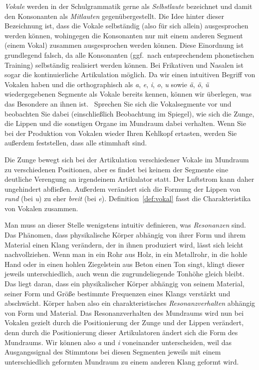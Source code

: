 \textit{Vokale} werden in der Schulgrammatik gerne als \textit{Selbstlaute} bezeichnet und damit den Konsonanten als \textit{Mitlauten} gegenübergestellt.
Die Idee hinter dieser Bezeichnung ist, dass die Vokale selbständig (also für sich allein) ausgesprochen werden können, wohingegen die Konsonanten nur mit einem anderen Segment (einem Vokal) zusammen ausgesprochen werden können.
Diese Einordnung ist grundlegend falsch, da alle Konsonanten (ggf.\ nach entsprechendem phonetischen Training) selbständig realisiert werden können.
Bei Frikativen und Nasalen ist sogar die kontinuierliche Artikulation möglich.
Da wir einen intuitiven Begriff von Vokalen haben und die orthographisch als \textit{a}, \textit{e}, \textit{i}, \textit{o}, \textit{u} sowie \textit{ä}, \textit{ö}, \textit{ü} wiedergegebenen Segmente als Vokale bereits kennen, können wir überlegen, was das Besondere an ihnen ist.
\TuBegin~Sprechen Sie sich die Vokalsegmente vor und beobachten Sie dabei (einschließlich Beobachtung im Spiegel), wie sich die Zunge, die Lippen und die sonstigen Organe im Mundraum dabei verhalten. Wenn Sie bei der Produktion von Vokalen wieder Ihren Kehlkopf ertasten, werden Sie außerdem feststellen, dass alle stimmhaft sind.

Die Zunge bewegt sich bei der Artikulation verschiedener Vokale im Mund\-raum zu verschiedenen Positionen, aber es findet bei keinem der Segmente eine deutliche Verengung an irgendeinem Artikulator statt.
Der Luftstrom kann daher ungehindert abfließen.
Außerdem verändert sich die Formung der Lippen von \textit{rund} (\zB bei \textit{u}) zu eher \textit{breit} (\zB bei \textit{e}).
Definition~\ref{def:vokal} fasst die Charakteristika von Vokalen zusammen.


Man muss an dieser Stelle wenigstens intuitiv definieren, was \textit{Resonanzen} sind.
Das Phänomen, dass physikalische Körper abhängig von ihrer Form und ihrem Material einen Klang verändern, der in ihnen produziert wird, lässt sich leicht nachvollziehen.
Wenn man in ein Rohr aus Holz, in ein Metallrohr, in die hohle Hand oder in einen hohlen Ziegelstein aus Beton einen Ton singt, klingt dieser jeweils unterschiedlich, auch wenn die zugrundeliegende Tonhöhe gleich bleibt.
Das liegt daran, dass ein physikalischer Körper abhängig von seinem Material, seiner Form und Größe bestimmte Frequenzen eines Klangs verstärkt und abschwächt.
Körper haben also ein charakteristisches \textit{Resonanzverhalten} abhängig von Form und Material.
Das Resonanzverhalten des Mundraums wird nun bei Vokalen gezielt durch die Positionierung der Zunge und der Lippen verändert, denn durch die Positionierung dieser Artikulatoren ändert sich die Form des Mundraums.
Wir können also \textit{a} und \textit{i} voneinander unterscheiden, weil das Ausgangssignal des Stimmtons bei diesen Segmenten jeweils mit einem unterschiedlich geformten Mundraum zu einem anderen Klang geformt wird.

